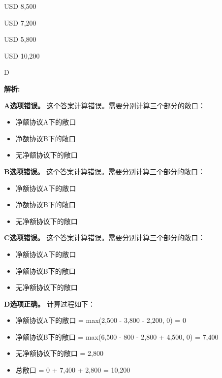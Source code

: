 \documentclass{article}
\newenvironment{explanation}
{\textbf{解析:}\par}
{\par}
\begin{document}
\begin{choices}
    \item USD 8,500
    \item USD 7,200
    \item USD 5,800
    \item USD 10,200
\end{choices}

\begin{correctanswer}
    D
\end{correctanswer}

\begin{explanation}
    \textbf{A选项错误。}
    这个答案计算错误。需要分别计算三个部分的敞口：
    \begin{itemize}
        \item 净额协议A下的敞口
        \item 净额协议B下的敞口
        \item 无净额协议下的敞口
    \end{itemize}

    \textbf{B选项错误。}
    这个答案计算错误。需要分别计算三个部分的敞口：
    \begin{itemize}
        \item 净额协议A下的敞口
        \item 净额协议B下的敞口
        \item 无净额协议下的敞口
    \end{itemize}

    \textbf{C选项错误。}
    这个答案计算错误。需要分别计算三个部分的敞口：
    \begin{itemize}
        \item 净额协议A下的敞口
        \item 净额协议B下的敞口
        \item 无净额协议下的敞口
    \end{itemize}

    \textbf{D选项正确。}
    计算过程如下：
    \begin{itemize}
        \item 净额协议A下的敞口 = max(2,500 - 3,800 - 2,200, 0) = 0
        \item 净额协议B下的敞口 = max(6,500 - 800 - 2,800 + 4,500, 0) = 7,400
        \item 无净额协议下的敞口 = 2,800
        \item 总敞口 = 0 + 7,400 + 2,800 = 10,200
    \end{itemize}
\end{explanation}
\end{document}
